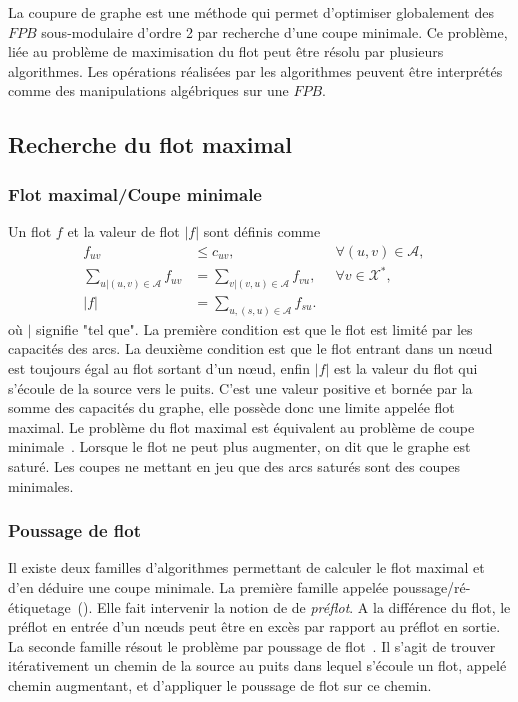 \documentclass[../main/These_Mathias_Paget.tex]{subfiles}
\begin{document}
La coupure de graphe est une méthode qui permet d'optimiser globalement des $FPB$ sous-modulaire d'ordre 2 par recherche d'une coupe minimale. Ce problème, liée au problème de maximisation du flot peut être résolu par plusieurs algorithmes. Les opérations réalisées par les algorithmes peuvent être interprétés comme des manipulations algébriques sur une $FPB$.

\subsection{Recherche du flot maximal}

\subsubsection{Flot maximal/Coupe minimale}
\label{sss:maxflow_mincut}

Un flot $f$ et la valeur de flot $|f|$ sont définis comme
	\begin{equation}
	\begin{aligned}
		 f_{uv}  & \leq c_{uv} , \; \; & \forall (u,v)  \in \boldsymbol{\mathcal{A}}, & \\
		 \sum_{u|(u,v) \in \boldsymbol{\mathcal{A}}} f_{uv} & = \sum_{v|(v,u) \in \boldsymbol{\mathcal{A}}} f_{vu} , \; \; & \forall v \in \boldsymbol{\mathcal{X}^*}, &\\
	     |f| & = \sum_{u,(s,u) \in \boldsymbol{\mathcal{A}}} f_{su}. &
	\end{aligned} 
	\end{equation}
où $|$ signifie "tel que". La première condition est que le flot est limité par les capacités des arcs. La deuxième condition est que le flot entrant dans un nœud est toujours égal au flot sortant d'un nœud, enfin  $|f|$ est la valeur du flot qui s'écoule de la source vers le puits. C'est une valeur positive et bornée par la somme des capacités du graphe, elle possède donc une limite appelée flot maximal. Le problème du flot maximal est équivalent au problème de coupe minimale~\citep{elias1956}. Lorsque le flot ne peut plus augmenter, on dit que le graphe est saturé. Les coupes ne mettant en jeu que des arcs saturés sont des coupes minimales.

\subsubsection{Poussage de flot}	
	Il existe deux familles d'algorithmes permettant de calculer le flot maximal et d'en déduire une coupe minimale. La première famille appelée poussage/ré-étiquetage~(\citet{Goldberg88ACM}). Elle fait intervenir la notion de de \textit{préflot}. A la différence du  flot, le préflot en entrée d'un nœuds peut être en excès par rapport au préflot en sortie. La seconde famille résout le problème par poussage de flot~\citep{Ford62book}. Il s'agit de trouver itérativement un chemin de la source au puits dans lequel s'écoule un flot, appelé chemin augmentant, et d'appliquer le poussage de flot sur ce chemin.
	
\end{document}
